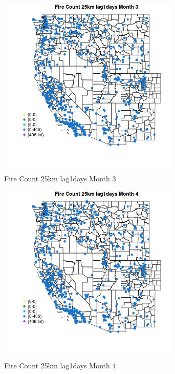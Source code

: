 \begin{figure} 
\centering  
\includegraphics[width=0.77\textwidth]{Code_Outputs/Report_ML_input_PM25_Step4_part_f_de_duplicated_aves_prioritize_24hr_obswNAs_MapObsMo3Fire_Count_25km_lag1days.jpg} 
\caption{\label{fig:Report_ML_input_PM25_Step4_part_f_de_duplicated_aves_prioritize_24hr_obswNAsMapObsMo3Fire_Count_25km_lag1days}Fire Count 25km lag1days Month 3} 
\end{figure} 
 

\begin{figure} 
\centering  
\includegraphics[width=0.77\textwidth]{Code_Outputs/Report_ML_input_PM25_Step4_part_f_de_duplicated_aves_prioritize_24hr_obswNAs_MapObsMo4Fire_Count_25km_lag1days.jpg} 
\caption{\label{fig:Report_ML_input_PM25_Step4_part_f_de_duplicated_aves_prioritize_24hr_obswNAsMapObsMo4Fire_Count_25km_lag1days}Fire Count 25km lag1days Month 4} 
\end{figure} 
 

